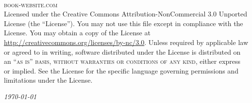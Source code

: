 \newpage
~\vfill
\thispagestyle{empty}



\noindent \textsc{book-website.com}\\

\noindent Licensed under the Creative Commons Attribution-NonCommercial 3.0 Unported License (the ``License''). You may not use this file except in compliance with the License. You may obtain a copy of the License at \url{http://creativecommons.org/licenses/by-nc/3.0}. Unless required by applicable law or agreed to in writing, software distributed under the License is distributed on an \textsc{``as is'' basis, without warranties or conditions of any kind}, either express or implied. See the License for the specific language governing permissions and limitations under the License.

\noindent \textit{\today}\\